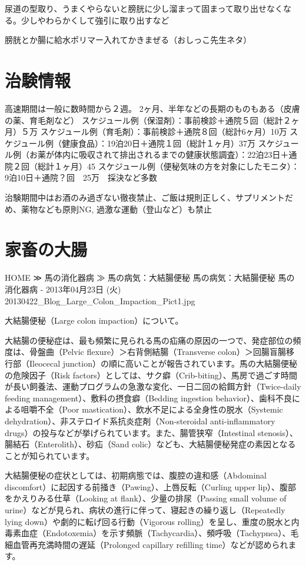 尿道の型取り、うまくやらないと膀胱に少し溜まって固まって取り出せなくなる。少しやわらかくして強引に取り出すなど

膀胱とか腸に給水ポリマー入れてかきまぜる（おしっこ先生ネタ）

\section{治験情報}
高速期間は一般に数時間から２週。
2ヶ月、半年などの長期のものもある（皮膚の薬、育毛剤など）
スケジュール例（保湿剤）：事前検診＋通院５回（総計２ヶ月）５万
スケジュール例（育毛剤）：事前検診＋通院８回（総計6ヶ月）10万
スケジュール例（健康食品）：19泊20日＋通院１回（総計１ヶ月）37万
スケジュール例（お薬が体内に吸収されて排出されるまでの健康状態調査）：22泊23日＋通院２回（総計１ヶ月）45
スケジュール例（便秘気味の方を対象にしたモニタ）：9泊10日＋通院？回　25万　採決など多数

治験期間中はお酒のみ過ぎない徹夜禁止、ご飯は規則正しく、サプリメントだめ、薬物なども原則NG,
過激な運動（登山など）も禁止


\section{家畜の大腸}


HOME   ≫   馬の消化器病  ≫  馬の病気：大結腸便秘
馬の病気：大結腸便秘
馬の消化器病 - 2013年04月23日 (火)
20130422_Blog_Large_Colon_Impaction_Pict1.jpg

大結腸便秘（Large colon impaction）について。

大結腸の便秘症は、最も頻繁に見られる馬の疝痛の原因の一つで、発症部位の頻度は、骨盤曲（Pelvic flexure）＞右背側結腸（Transverse colon）＞回腸盲腸移行部（Ileocecal junction）の順に高いことが報告されています。馬の大結腸便秘の危険因子（Risk factors）としては、サク癖（Crib-biting）、馬房で過ごす時間が長い飼養法、運動プログラムの急激な変化、一日二回の給餌方針（Twice-daily feeding management）、敷料の摂食癖（Bedding ingestion behavior）、歯科不良による咀嚼不全（Poor mastication）、飲水不足による全身性の脱水（Systemic dehydration）、非ステロイド系抗炎症剤（Non-steroidal anti-inflammatory drugs）の投与などが挙げられています。また、腸管狭窄（Intestinal stenosis）、腸結石（Enterolith）、砂疝（Sand colic）なども、大結腸便秘発症の素因となることが知られています。

大結腸便秘の症状としては、初期病態では、腹腔の違和感（Abdominal discomfort）に起因する前掻き（Pawing）、上唇反転（Curling upper lip）、腹部をかえりみる仕草（Looking at flank）、少量の排尿（Passing small volume of urine）などが見られ、病状の進行に伴って、寝起きの繰り返し（Repeatedly lying down）や劇的に転げ回る行動（Vigorous rolling）を呈し、重度の脱水と内毒素血症（Endotoxemia）を示す頻脈（Tachycardia）、頻呼吸（Tachypnea）、毛細血管再充満時間の遅延（Prolonged capillary refilling time）などが認められます。

